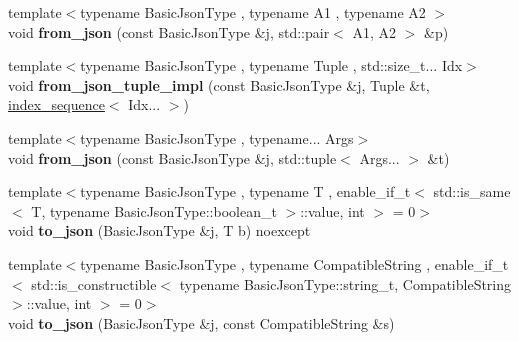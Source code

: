 \begin{DoxyCompactItemize}
\item 
{\footnotesize template$<$typename Basic\+Json\+Type , typename A1 , typename A2 $>$ }\\void {\bfseries from\+\_\+json} (const Basic\+Json\+Type \&j, std\+::pair$<$ A1, A2 $>$ \&p)\hypertarget{namespacenlohmann_1_1detail_aae9f9c2601074e323d49428132cc293d}{}\label{namespacenlohmann_1_1detail_aae9f9c2601074e323d49428132cc293d}

\item 
{\footnotesize template$<$typename Basic\+Json\+Type , typename Tuple , std\+::size\+\_\+t... Idx$>$ }\\void {\bfseries from\+\_\+json\+\_\+tuple\+\_\+impl} (const Basic\+Json\+Type \&j, Tuple \&t, \hyperlink{structnlohmann_1_1detail_1_1index__sequence}{index\+\_\+sequence}$<$ Idx... $>$)\hypertarget{namespacenlohmann_1_1detail_a28253915d9db4a0112d60eaee0422949}{}\label{namespacenlohmann_1_1detail_a28253915d9db4a0112d60eaee0422949}

\item 
{\footnotesize template$<$typename Basic\+Json\+Type , typename... Args$>$ }\\void {\bfseries from\+\_\+json} (const Basic\+Json\+Type \&j, std\+::tuple$<$ Args... $>$ \&t)\hypertarget{namespacenlohmann_1_1detail_a8b99ec9b29f3f20a18fc4281fb784e49}{}\label{namespacenlohmann_1_1detail_a8b99ec9b29f3f20a18fc4281fb784e49}

\item 
{\footnotesize template$<$typename Basic\+Json\+Type , typename T , enable\+\_\+if\+\_\+t$<$ std\+::is\+\_\+same$<$ T, typename Basic\+Json\+Type\+::boolean\+\_\+t $>$\+::value, int $>$  = 0$>$ }\\void {\bfseries to\+\_\+json} (Basic\+Json\+Type \&j, T b) noexcept\hypertarget{namespacenlohmann_1_1detail_a1a804b98cbe89b7e44b698f2ca860490}{}\label{namespacenlohmann_1_1detail_a1a804b98cbe89b7e44b698f2ca860490}

\item 
{\footnotesize template$<$typename Basic\+Json\+Type , typename Compatible\+String , enable\+\_\+if\+\_\+t$<$ std\+::is\+\_\+constructible$<$ typename Basic\+Json\+Type\+::string\+\_\+t, Compatible\+String $>$\+::value, int $>$  = 0$>$ }\\void {\bfseries to\+\_\+json} (Basic\+Json\+Type \&j, const Compatible\+String \&s)\hypertarget{namespacenlohmann_1_1detail_a7356ed05cdbbb080cee80e1211e1c6c9}{}\label{namespacenlohmann_1_1detail_a7356ed05cdbbb080cee80e1211e1c6c9}


\end{DoxyCompactItemize}

